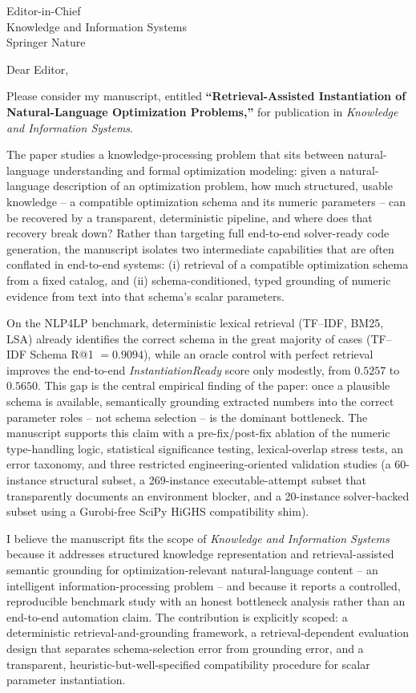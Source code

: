 \documentclass[12pt]{letter}
\begin{document}
\begin{letter}{Editor-in-Chief\\
Knowledge and Information Systems\\
Springer Nature}

\opening{Dear Editor,}

Please consider my manuscript, entitled \textbf{``Retrieval-Assisted Instantiation of Natural-Language Optimization Problems,''} for publication in \textit{Knowledge and Information Systems}.

The paper studies a knowledge-processing problem that sits between natural-language understanding and formal optimization modeling: given a natural-language description of an optimization problem, how much structured, usable knowledge -- a compatible optimization schema and its numeric parameters -- can be recovered by a transparent, deterministic pipeline, and where does that recovery break down? Rather than targeting full end-to-end solver-ready code generation, the manuscript isolates two intermediate capabilities that are often conflated in end-to-end systems: (i) retrieval of a compatible optimization schema from a fixed catalog, and (ii) schema-conditioned, typed grounding of numeric evidence from text into that schema's scalar parameters.

On the \textsc{NLP4LP} benchmark, deterministic lexical retrieval (TF--IDF, BM25, LSA) already identifies the correct schema in the great majority of cases (TF--IDF Schema R@1 $=0.9094$), while an oracle control with perfect retrieval improves the end-to-end \textit{InstantiationReady} score only modestly, from $0.5257$ to $0.5650$. This gap is the central empirical finding of the paper: once a plausible schema is available, semantically grounding extracted numbers into the correct parameter roles -- not schema selection -- is the dominant bottleneck. The manuscript supports this claim with a pre-fix/post-fix ablation of the numeric type-handling logic, statistical significance testing, lexical-overlap stress tests, an error taxonomy, and three restricted engineering-oriented validation studies (a 60-instance structural subset, a 269-instance executable-attempt subset that transparently documents an environment blocker, and a 20-instance solver-backed subset using a Gurobi-free SciPy HiGHS compatibility shim).

I believe the manuscript fits the scope of \textit{Knowledge and Information Systems} because it addresses structured knowledge representation and retrieval-assisted semantic grounding for optimization-relevant natural-language content -- an intelligent information-processing problem -- and because it reports a controlled, reproducible benchmark study with an honest bottleneck analysis rather than an end-to-end automation claim. The contribution is explicitly scoped: a deterministic retrieval-and-grounding framework, a retrieval-dependent evaluation design that separates schema-selection error from grounding error, and a transparent, heuristic-but-well-specified compatibility procedure for scalar parameter instantiation.


\end{letter}
\end{document}
